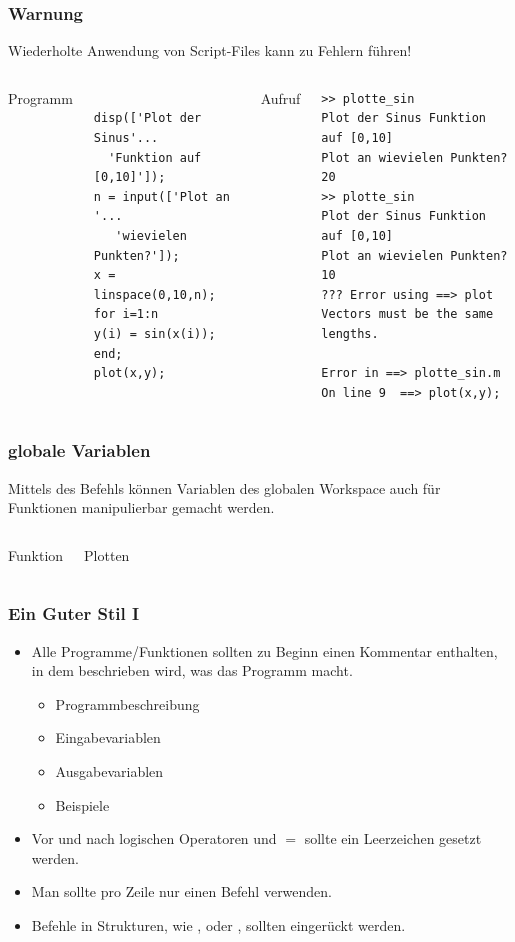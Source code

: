 \documentclass[hyperref={xetex}]{beamer}
\begin{document}
%
%
\begin{frame}[fragile]\frametitle{Warnung}
\begin{center}
\alert{ Wiederholte Anwendung von Script-Files kann zu Fehlern führen!}\\[0.5cm]
\end{center}
\begin{columns}[t]
\alert{Programm}
\begin{lstlisting}[basicstyle=\scriptsize]
% plotte_sin.m

disp(['Plot der Sinus'...
  'Funktion auf [0,10]']);
n = input(['Plot an '...
   'wievielen Punkten?']);
x = linspace(0,10,n);
for i=1:n
y(i) = sin(x(i));
end; 
plot(x,y);
\end{lstlisting}
\alert{ Aufruf}
\begin{lstlisting}[basicstyle=\scriptsize]
>> plotte_sin
Plot der Sinus Funktion auf [0,10]
Plot an wievielen Punkten?20
>> plotte_sin
Plot der Sinus Funktion auf [0,10]
Plot an wievielen Punkten?10
??? Error using ==> plot
Vectors must be the same lengths.

Error in ==> plotte_sin.m
On line 9  ==> plot(x,y);
\end{lstlisting}
\end{columns}
\end{frame}
%
%
\begin{frame}[fragile]\frametitle{globale Variablen}
Mittels des Befehls \alert{ } können Variablen des
globalen Workspace auch für Funktionen manipulierbar gemacht werden.
\bigskip
\begin{columns}[t]
\alert{ Funktion}

\alert{ Plotten}

\end{columns}
\end{frame}
%
%
\begin{frame}[fragile]\frametitle{Ein Guter Stil I }
\begin{itemize}
\item Alle Programme/Funktionen sollten zu Beginn einen Kommentar enthalten, in
  dem beschrieben wird, was das Programm macht.
  \begin{itemize}
      \item Programmbeschreibung
      \item Eingabevariablen
      \item Ausgabevariablen
      \item Beispiele
  \end{itemize}
\item Vor und nach logischen Operatoren und $=$ sollte ein Leerzeichen
  gesetzt werden.
\item Man sollte pro Zeile nur einen Befehl verwenden.
\item Befehle in  Strukturen, wie  , 
  oder , sollten eingerückt werden. 
\end{itemize}
\end{frame}
\end{document}
